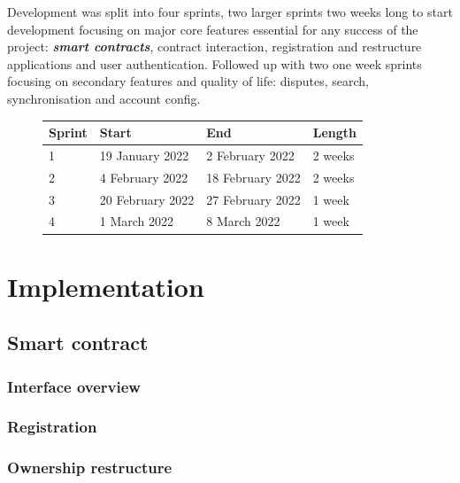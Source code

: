 \documentclass[12pt]{article}
\newcommand{\keyword}[1]{\textbf{\textit{#1}}}
\begin{document}
Development was split into four sprints, two larger sprints two weeks long to start development focusing on major core features essential for any success of the project: \keyword{smart contracts}, contract interaction, registration and restructure applications and user authentication. Followed up with two one week sprints focusing on secondary features and quality of life: disputes, search, synchronisation and account config. 

\begin{figure}[H]
\hfil
\begin{tabular}{|l|l|l|l|}
\hline
Sprint & Start            & End              & Length  \\ \hline
1      & 19 January 2022  & 2 February 2022  & 2 weeks \\ \hline
2      & 4 February 2022  & 18 February 2022 & 2 weeks \\ \hline
3      & 20 February 2022 & 27 February 2022 & 1 week  \\ \hline
4      & 1 March 2022     & 8 March 2022     & 1 week  \\ \hline
\end{tabular}
\end{figure}

\section{Implementation}

\subsection{Smart contract}

\subsubsection{Interface overview}

\subsubsection{Registration}

\subsubsection{Ownership restructure}
\end{document}
